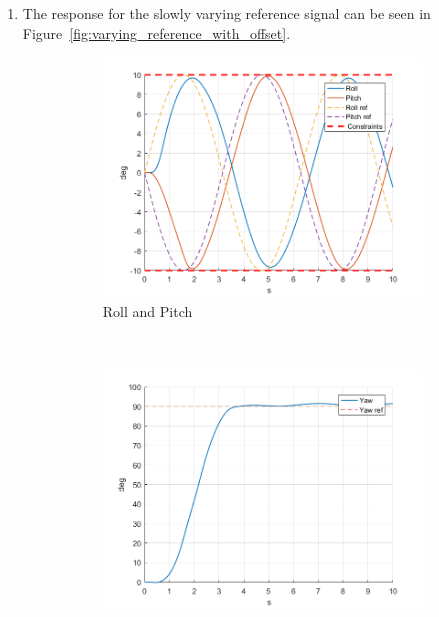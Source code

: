 \documentclass[11pt]{article}
\begin{document}
\begin{enumerate}
    \item The response for the slowly varying reference signal can be seen in
    Figure~\ref{fig:varying_reference_with_offset}.
    \begin{figure}[ht]
        \centering
        \begin{subfigure}[c]{0.3\linewidth}
            \centering
            \includegraphics[width=\linewidth]{Plots_06_ReferenceTracking_Varying/01}
            \caption{Roll and Pitch}
        \end{subfigure}
        ~
        \begin{subfigure}[c]{0.3\linewidth}
            \centering
            \includegraphics[width=\linewidth]{Plots_06_ReferenceTracking_Varying/02}

\end{subfigure}
\end{figure}
\end{enumerate}
\end{document}
